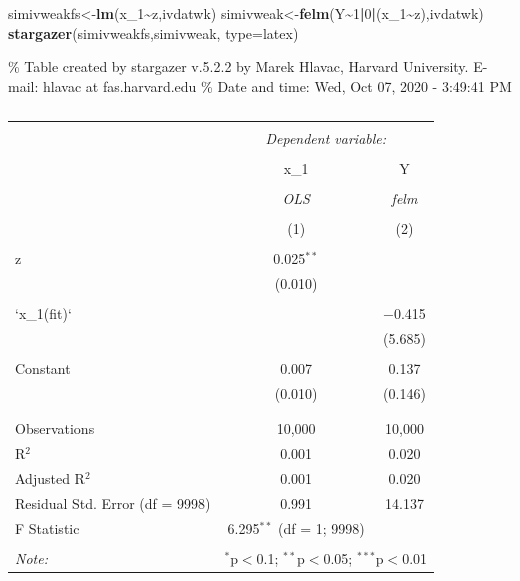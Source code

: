 \documentclass[
]{article}
\newenvironment{Shaded}{\begin{snugshade}}{\end{snugshade}}
\newcommand{\DataTypeTok}[1]{\textcolor[rgb]{0.13,0.29,0.53}{#1}}
\newcommand{\DecValTok}[1]{\textcolor[rgb]{0.00,0.00,0.81}{#1}}
\newcommand{\KeywordTok}[1]{\textcolor[rgb]{0.13,0.29,0.53}{\textbf{#1}}}
\newcommand{\NormalTok}[1]{#1}
\newcommand{\OperatorTok}[1]{\textcolor[rgb]{0.81,0.36,0.00}{\textbf{#1}}}
\newcommand{\StringTok}[1]{\textcolor[rgb]{0.31,0.60,0.02}{#1}}
\begin{document}
\begin{Shaded}
\begin{Highlighting}[]
\NormalTok{simivweakfs\textless{}{-}}\KeywordTok{lm}\NormalTok{(x\_}\DecValTok{1}\OperatorTok{\textasciitilde{}}\NormalTok{z,ivdatwk)}
\NormalTok{simivweak\textless{}{-}}\KeywordTok{felm}\NormalTok{(Y}\OperatorTok{\textasciitilde{}}\DecValTok{1}\OperatorTok{|}\DecValTok{0}\OperatorTok{|}\NormalTok{(x\_}\DecValTok{1}\OperatorTok{\textasciitilde{}}\NormalTok{z),ivdatwk)}
\KeywordTok{stargazer}\NormalTok{(simivweakfs,simivweak,  }\DataTypeTok{type=}\StringTok{\textquotesingle{}latex\textquotesingle{}}\NormalTok{)}
\end{Highlighting}
\end{Shaded}

\% Table created by stargazer v.5.2.2 by Marek Hlavac, Harvard
University. E-mail: hlavac at fas.harvard.edu \% Date and time: Wed, Oct
07, 2020 - 3:49:41 PM

\begin{table}[!htbp] \centering 
  \caption{} 
  \label{} 
\begin{tabular}{@{\extracolsep{5pt}}lcc} 
\\[-1.8ex]\hline 
\hline \\[-1.8ex] 
 & \multicolumn{2}{c}{\textit{Dependent variable:}} \\ 
\cline{2-3} 
\\[-1.8ex] & x\_1 & Y \\ 
\\[-1.8ex] & \textit{OLS} & \textit{felm} \\ 
\\[-1.8ex] & (1) & (2)\\ 
\hline \\[-1.8ex] 
 z & 0.025$^{**}$ &  \\ 
  & (0.010) &  \\ 
  & & \\ 
 `x\_1(fit)` &  & $-$0.415 \\ 
  &  & (5.685) \\ 
  & & \\ 
 Constant & 0.007 & 0.137 \\ 
  & (0.010) & (0.146) \\ 
  & & \\ 
\hline \\[-1.8ex] 
Observations & 10,000 & 10,000 \\ 
R$^{2}$ & 0.001 & 0.020 \\ 
Adjusted R$^{2}$ & 0.001 & 0.020 \\ 
Residual Std. Error (df = 9998) & 0.991 & 14.137 \\ 
F Statistic & 6.295$^{**}$ (df = 1; 9998) &  \\ 
\hline 
\hline \\[-1.8ex] 
\textit{Note:}  & \multicolumn{2}{r}{$^{*}$p$<$0.1; $^{**}$p$<$0.05; $^{***}$p$<$0.01} \\ 
\end{tabular} 
\end{table}
\end{document}
